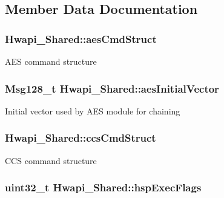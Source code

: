 \subsection{Member Data Documentation}
\hypertarget{structHwapi__Shared_a421dabc4084984636e3cf9eb4b921dc1}{
\subsubsection[{aes\-Cmd\-Struct}]{ Hwapi\-\_\-\-Shared\-::aes\-Cmd\-Struct}}\label{structHwapi__Shared_a421dabc4084984636e3cf9eb4b921dc1}
A\-E\-S command structure \hypertarget{structHwapi__Shared_a6fffb479f4b0d7a499df1ae2db1260c9}{
\subsubsection[{aes\-Initial\-Vector}]{\setlength{\rightskip}{0pt plus 5cm}Msg128\-\_\-t Hwapi\-\_\-\-Shared\-::aes\-Initial\-Vector}}\label{structHwapi__Shared_a6fffb479f4b0d7a499df1ae2db1260c9}
Initial vector used by A\-E\-S module for chaining \hypertarget{structHwapi__Shared_a265c08c7109dfb1aca07d1cac2a87601}{
\subsubsection[{ccs\-Cmd\-Struct}]{ Hwapi\-\_\-\-Shared\-::ccs\-Cmd\-Struct}}\label{structHwapi__Shared_a265c08c7109dfb1aca07d1cac2a87601}
C\-C\-S command structure \hypertarget{structHwapi__Shared_a82519fcf08ae4d8d15aecfda380f9791}{
\subsubsection[{hsp\-Exec\-Flags}]{\setlength{\rightskip}{0pt plus 5cm}uint32\-\_\-t Hwapi\-\_\-\-Shared\-::hsp\-Exec\-Flags}}\label{structHwapi__Shared_a82519fcf08ae4d8d15aecfda380f9791}
